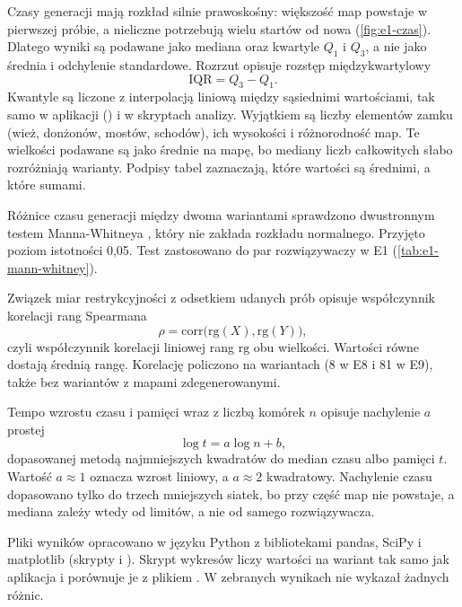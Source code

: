 Czasy generacji mają rozkład silnie prawoskośny: większość map powstaje w pierwszej próbie, a nieliczne potrzebują wielu startów od nowa (\cref{fig:e1-czas}). Dlatego wyniki są podawane jako mediana oraz kwartyle $Q_1$ i $Q_3$, a nie jako średnia i odchylenie standardowe. Rozrzut opisuje rozstęp międzykwartylowy
\begin{equation}
  \mathrm{IQR} = Q_3 - Q_1 .
  \label{eq:iqr}
\end{equation}
Kwantyle są liczone z interpolacją liniową między sąsiednimi wartościami, tak samo w aplikacji () i w skryptach analizy. Wyjątkiem są liczby elementów zamku (wież, donżonów, mostów, schodów), ich wysokości i różnorodność map. Te wielkości podawane są jako średnie na mapę, bo mediany liczb całkowitych słabo rozróżniają warianty. Podpisy tabel zaznaczają, które wartości są średnimi, a które sumami.

Różnice czasu generacji między dwoma wariantami sprawdzono dwustronnym testem Manna-Whitneya \cite{MannWhitney1947}, który nie zakłada rozkładu normalnego. Przyjęto poziom istotności 0,05. Test zastosowano do par rozwiązywaczy w E1 (\cref{tab:e1-mann-whitney}).

Związek miar restrykcyjności z odsetkiem udanych prób opisuje współczynnik korelacji rang Spearmana \cite{Spearman1904}
\begin{equation}
  \rho = \mathrm{corr}\bigl(\mathrm{rg}(X), \mathrm{rg}(Y)\bigr) ,
  \label{eq:spearman}
\end{equation}
czyli współczynnik korelacji liniowej rang $\mathrm{rg}$ obu wielkości. Wartości równe dostają średnią rangę. Korelację policzono na wariantach (8 w E8 i 81 w E9), także bez wariantów z mapami zdegenerowanymi.

Tempo wzrostu czasu i pamięci wraz z liczbą komórek $n$ opisuje nachylenie $a$ prostej
\begin{equation}
  \log t = a \log n + b ,
  \label{eq:nachylenie}
\end{equation}
dopasowanej metodą najmniejszych kwadratów do median czasu albo pamięci $t$. Wartość $a \approx 1$ oznacza wzrost liniowy, a $a \approx 2$ kwadratowy. Nachylenie czasu dopasowano tylko do trzech mniejszych siatek, bo przy  część map nie powstaje, a mediana zależy wtedy od limitów, a nie od samego rozwiązywacza.

Pliki wyników opracowano w języku Python z bibliotekami pandas, SciPy i matplotlib (skrypty  i ). Skrypt wykresów liczy wartości na wariant tak samo jak aplikacja i porównuje je z plikiem . W zebranych wynikach nie wykazał żadnych różnic.

